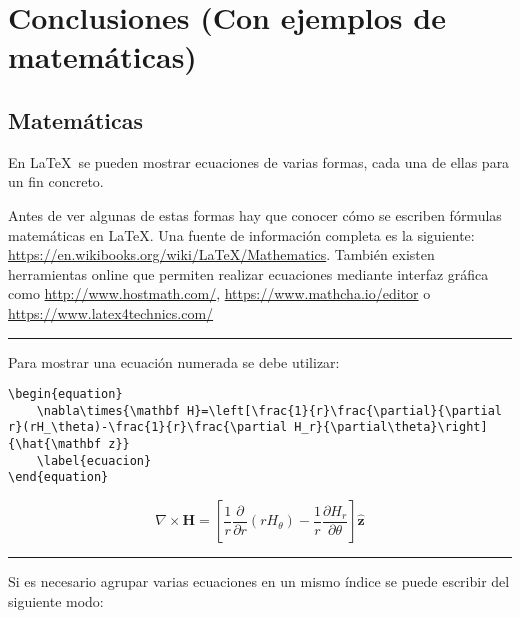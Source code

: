 
\chapter{Conclusiones (Con ejemplos de matemáticas)}
\label{conclusiones}

\section{Matemáticas}

En \LaTeX~se pueden mostrar ecuaciones de varias formas, cada una de ellas para un fin concreto.
\par Antes de ver algunas de estas formas hay que conocer cómo se escriben fórmulas matemáticas en \LaTeX. Una fuente de información completa es la siguiente: \url{https://en.wikibooks.org/wiki/LaTeX/Mathematics}. También existen herramientas online que permiten realizar ecuaciones mediante interfaz gráfica como \url{http://www.hostmath.com/}, \url{https://www.mathcha.io/editor} o \url{https://www.latex4technics.com/}
\vspace{1em}
\noindent\hrule
\vspace{1em}
Para mostrar una ecuación numerada se debe utilizar:
\begin{lstlisting}[style=Latex-color,label=latex_code1]
\begin{equation}
	\nabla\times{\mathbf H}=\left[\frac{1}{r}\frac{\partial}{\partial r}(rH_\theta)-\frac{1}{r}\frac{\partial H_r}{\partial\theta}\right]{\hat{\mathbf z}}
	\label{ecuacion}
\end{equation}
\end{lstlisting}
\begin{equation}
  \nabla\times{\mathbf H}=\left[\frac{1}{r}\frac{\partial}{\partial
        r}(rH_\theta)-\frac{1}{r}\frac{\partial
        H_r}{\partial\theta}\right]{\hat{\mathbf z}}
        \label{ecuacion}
\end{equation}
\vspace{1em}
\noindent\hrule
\vspace{1em}
Si es necesario agrupar varias ecuaciones en un mismo índice se puede escribir del siguiente modo:

